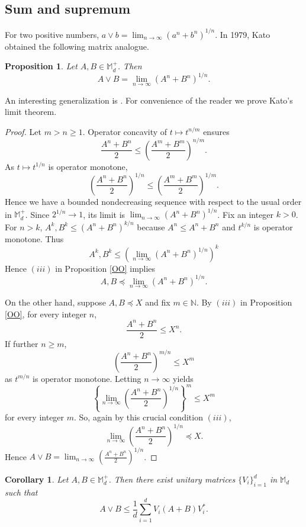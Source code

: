 \documentclass[12pt,reqno]{article}
\newtheorem{cor}[theorem]{Corollary}
\newtheorem{prop}[theorem]{Proposition}
\theoremstyle{definition}
\theoremstyle{remark}
\numberwithin{equation}{section}
\def\bM{\mathbb{M}}
\def\bN{\mathbb{N}}
\begin{document}
\subsection{Sum and supremum}

For two positive numbers, $a\vee b=\lim_{n\to\infty}(a^n+b^n)^{1/n}$. In 1979, Kato \cite{K} obtained the following matrix analogue.

\vskip 5pt
\begin{prop}  Let $A,B\in\bM_d^+$. Then 
$$
A\vee B =\lim_{n\to\infty} \left(A^n+B^n\right)^{1/n}.
$$
\end{prop}

An interesting generalization is \cite[Theorem 9]{AW}. For convenience of the reader we prove Kato's limit theorem.

\vskip 5pt
\begin{proof} Let $m>n\ge 1$. Operator concavity of $t\mapsto t^{n/m}$ ensures
$$
\frac{A^n+B^n}{2} \le \left(\frac{A^m+B^m}{2}\right)^{n/m}.
$$
As $t\mapsto t^{1/n}$
is operator monotone,
$$
\left(\frac{A^n+B^n}{2}\right)^{1/n} \le \left(\frac{A^m+B^m}{2}\right)^{1/m}.
$$
Hence we have  a bounded nondecreasing sequence with respect to the usual order in $\bM_d^+$. Since $2^{1/n}\to 1$, its limit is $\lim_{n\to\infty}(A^n+B^n)^{1/n}$. Fix an integer $k>0$. For $n>k$,
$
A^k, B^k \le (A^n+B^n)^{k/n} $  because $A^n\le A^n+B^n$ and $t^{k/n}$ is operator monotone.
Thus
$$
A^k, B^k \le \left(\lim_{n\to\infty}(A^n+B^n)^{1/n}\right)^k$$
Hence $(iii)$ in Proposition \ref{OO} implies
$$
A,B \preceq \lim_{n\to\infty}(A^n+B^n)^{1/n}.$$

 On the other hand, suppose $A,B\preceq X$ and fix $m\in\bN$. By $(iii)$ in Proposition \ref{OO}, for every integer $n$,
\begin{equation}\label{convOO}
 \frac{A^n+B^n}{2} \le X^n.
\end{equation}
If further $n\ge m$,
$$
 \left(\frac{A^n+B^n}{2}\right)^{m/n} \le X^m
$$
as  $t^{m/n}$ is operator monotone. Letting $n\to \infty$ yields
$$
\left\{\lim_{n\to\infty } \left(\frac{A^n+B^n}{2}\right)^{1/n}\right\}^m \le X^m
$$
for every integer $m$. So, again by this crucial condition $(iii)$, 
 $$
\lim_{n\to\infty } \left(\frac{A^n+B^n}{2}\right)^{1/n}\preceq X.
$$
Hence $A\vee B=\lim_{n\to\infty } \left(\frac{A^n+B^n}{2}\right)^{1/n}$.
\end{proof}








\vskip 5pt
\begin{cor}\label{sumvsmax} Let  $A,B\in\bM_d^+$. Then there exist unitary matrices $\{V_i\}_{i=1}^d$  in $\bM_d$ such that 
$$
A\vee B \le \frac{ 1}{d}  \sum_{i=1}^d V_i (A+ B) V_i^*.
$$
\end{cor}
\end{document}

